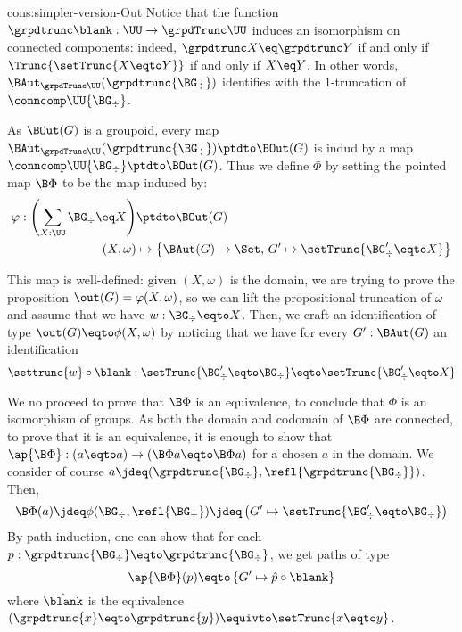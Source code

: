 \begin{implementation}{cons:simpler-version-Out}
  Notice that the function $\grpdtrunc \blank : \UU \to \grpdTrunc\UU$ induces
  an isomorphism on connected components: indeed,
  $\grpdtrunc X \eq \grpdtrunc Y$ if and only if $\Trunc{\setTrunc{X \eqto Y}}$
  if and only if $X \eq Y$. In other words,
  $\BAut_{\grpdTrunc\UU}(\grpdtrunc{\BG_\div})$ identifies with the
  $1$-truncation of $\conncomp\UU{\BG_\div}$.

  As $\BOut(G)$ is a groupoid, every map
  $\BAut_{\grpdTrunc\UU}(\grpdtrunc{\BG_\div}) \ptdto \BOut(G)$ is indud by a map
  $\conncomp\UU{\BG_\div} \ptdto \BOut(G)$. Thus we define $\Phi$ by setting the
  pointed map $\B\Phi$ to be the map induced by:
  \begin{align*}
    \varphi:
    \left(\sum_{X:\UU}\BG_\div \eq X\right) &\ptdto \BOut(G) \\
    (X,\omega) &\mapsto \left\{
      \BAut(G) \to \Set, \, G' \mapsto \setTrunc{\BG'_\div \eqto X}
      \right\}
  \end{align*}
  
  This map is well-defined: given $(X,\omega)$ is the domain, we are trying to
  prove the proposition $\out(G) = \varphi(X,\omega)$, so we can lift the
  propositional truncation of $\omega$ and assume that we have
  $w:\BG_\div \eqto X$. Then, we craft an identification of type
  $\out(G) \eqto \phi(X,\omega)$ by noticing that we have for every
  $G':\BAut(G)$ an identification
  \begin{displaymath}
    \settrunc{w} \circ \blank : \setTrunc{\BG'_\div \eqto \BG_\div} \eqto \setTrunc{\BG'_\div \eqto X}
  \end{displaymath}
  
  We no proceed to prove that $\B\Phi$ is an equivalence, to conclude that
  $\Phi$ is an isomorphism of groups. As both the domain and codomain of
  $\B\Phi$ are connected, to prove that it is an equivalence, it is enough to
  show that $\ap {\B\Phi}: (a \eqto a) \to (\B\Phi a \eqto \B\Phi a)$ for a
  chosen $a$ in the domain. We consider of course
  $a \jdeq (\grpdtrunc{\BG_\div},\refl{\grpdtrunc{\BG_\div}})$. Then,
  \begin{displaymath}
    \B\Phi(a) \jdeq \phi(\BG_\div,\refl{\BG_\div}) \jdeq  \left(
      G' \mapsto \setTrunc{\BG'_\div \eqto \BG_\div}
    \right)
  \end{displaymath}
  By path induction, one can show that for each
  $p:\grpdtrunc{\BG_\div} \eqto \grpdtrunc{\BG_\div}$, we get paths of type
  \begin{displaymath}
    \ap{\B\Phi} (p) \eqto \left\{
      G' \mapsto \hat p \circ \blank
    \right\}
  \end{displaymath}
  where $\hat \blank$ is the equivalence
  $(\grpdtrunc{x} \eqto \grpdtrunc{y}) \equivto \setTrunc{x \eqto y}$.


\end{implementation}
